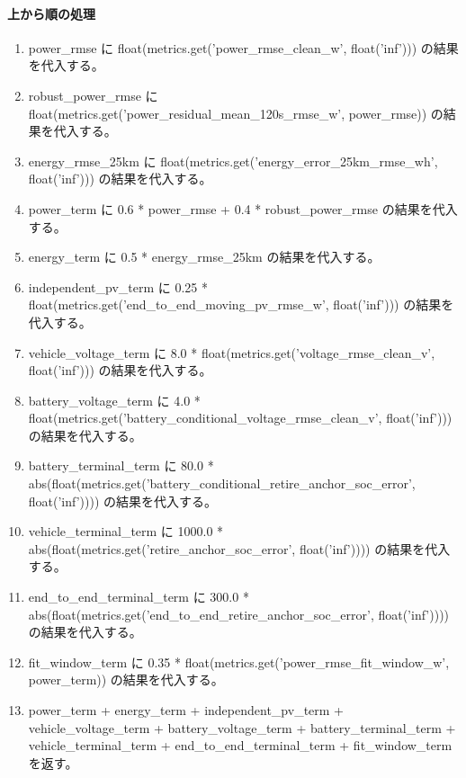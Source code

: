 \documentclass[a4paper,11pt]{article}
\begin{document}
            \paragraph{上から順の処理}
            \begin{enumerate}[leftmargin=1.8em]
            \item power\_rmse に float(metrics.get('power\_rmse\_clean\_w', float('inf'))) の結果を代入する。
\item robust\_power\_rmse に float(metrics.get('power\_residual\_mean\_120s\_rmse\_w', power\_rmse)) の結果を代入する。
\item energy\_rmse\_25km に float(metrics.get('energy\_error\_25km\_rmse\_wh', float('inf'))) の結果を代入する。
\item power\_term に 0.6 * power\_rmse + 0.4 * robust\_power\_rmse の結果を代入する。
\item energy\_term に 0.5 * energy\_rmse\_25km の結果を代入する。
\item independent\_pv\_term に 0.25 * float(metrics.get('end\_to\_end\_moving\_pv\_rmse\_w', float('inf'))) の結果を代入する。
\item vehicle\_voltage\_term に 8.0 * float(metrics.get('voltage\_rmse\_clean\_v', float('inf'))) の結果を代入する。
\item battery\_voltage\_term に 4.0 * float(metrics.get('battery\_conditional\_voltage\_rmse\_clean\_v', float('inf'))) の結果を代入する。
\item battery\_terminal\_term に 80.0 * abs(float(metrics.get('battery\_conditional\_retire\_anchor\_soc\_error', float('inf')))) の結果を代入する。
\item vehicle\_terminal\_term に 1000.0 * abs(float(metrics.get('retire\_anchor\_soc\_error', float('inf')))) の結果を代入する。
\item end\_to\_end\_terminal\_term に 300.0 * abs(float(metrics.get('end\_to\_end\_retire\_anchor\_soc\_error', float('inf')))) の結果を代入する。
\item fit\_window\_term に 0.35 * float(metrics.get('power\_rmse\_fit\_window\_w', power\_term)) の結果を代入する。
\item power\_term + energy\_term + independent\_pv\_term + vehicle\_voltage\_term + battery\_voltage\_term + battery\_terminal\_term + vehicle\_terminal\_term + end\_to\_end\_terminal\_term + fit\_window\_term を返す。
            \end{enumerate}
\end{document}

